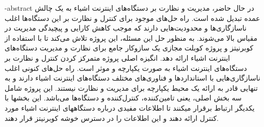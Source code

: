 \esalatPage
\mojavezPage



\newpage
\thispagestyle{empty}







\fa-abstract{
    در حال حاضر، مدیریت و نظارت بر دستگاه‌های
    اینترنت اشیاء
    به یک چالش عمده تبدیل شده است. راه حل‌های موجود
    برای کنترل و نظارت بر این دستگاه‌ها اغلب ناسازگاری‌ها و محدودیت‌هایی دارند که موجب کاهش کارایی و پیچیدگی مدیریت در مقیاس بالا می‌شوند.
    به منظور حل این مسئله، این پروژه تلاش می‌کند تا با استفاده از 
    کوبرنیتز
    و پروژه
    کوبلت مجازی
    یک سازوکار جامع برای نظارت و مدیریت دستگاه‌های اینترنت اشیاء ارائه دهد. انگیزه اصلی پروژه متمرکز
    کردن کنترل و نظارت بر دستگاه‌های اینترنت اشیاء به صورت یکپارچه و موثر است. راه حل‌های کنونی اغلب ناسازگاری‌هایی
    با استانداردها و فناوری‌های مختلف دستگاه‌های اینترنت اشیاء دارند و به تنهایی قادر به ارائه یک محیط یکپارچه برای
    مدیریت و نظارت نیستند. این پروژه شامل سه بخش اصلی، یعنی
    تامین‌کننده، کنترل‌کننده و دستگاه‌ها می‌باشد.
    این بخشها با یکدیگر ارتباط برقرار میکنند تا اطلاعات مفیدی درباره دستگاههای اینترنت اشیاء مورد کنترل ارائه دهند
    و این اطلاعات را در دسترس خوشه کوبرنیتز قرار دهند.
}

\abstractPage

\newpage\clearpage